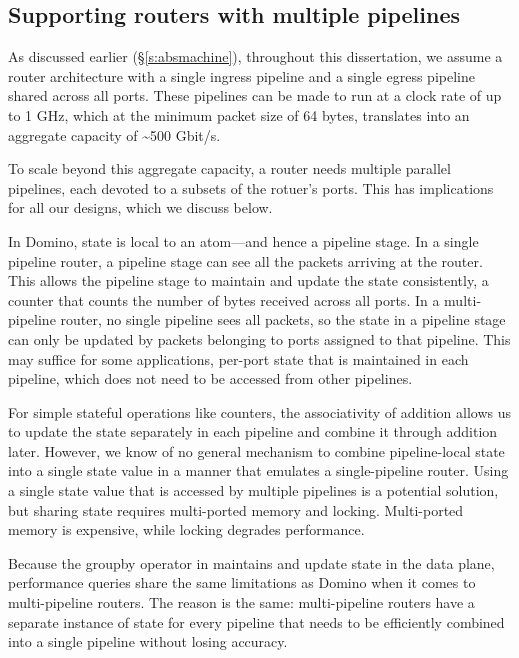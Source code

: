 \subsection{Supporting routers with multiple pipelines}
\label{ss:multiple}

As discussed earlier (\S\ref{s:absmachine}), throughout this dissertation, we
assume a router architecture with a single ingress pipeline and a single egress
pipeline shared across all ports. These pipelines can be made to run at a clock
rate of up to 1 GHz, which at the minimum packet size of 64 bytes, translates
into an aggregate capacity of \textasciitilde500 Gbit/s.

To scale beyond this aggregate capacity, a router needs multiple parallel
pipelines, each devoted to a subsets of the rotuer's ports. This has
implications for all our designs, which we discuss below.

 In Domino, state is local to an atom---and hence a pipeline
stage.  In a single pipeline router, a pipeline stage can see all the packets
arriving at the router. This allows the pipeline stage to maintain and update
the state consistently, \eg a counter that counts the number of bytes received
across all ports. In a multi-pipeline router, no single pipeline sees all
packets, so the state in a pipeline stage can only be updated by packets
belonging to ports assigned to that pipeline. This may suffice for some
applications, \eg per-port state that is maintained in each pipeline, which
does not need to be accessed from  other pipelines. 

For simple stateful operations like counters, the associativity of addition
allows us to update the state separately in each pipeline and combine it
through addition later. However, we know of no general mechanism to combine
pipeline-local state into a single state value in a manner that emulates a
single-pipeline router. Using a single state value that is accessed by multiple
pipelines is a potential solution, but sharing state requires multi-ported
memory and locking. Multi-ported memory is expensive, while locking degrades
performance.

 Because the {\ct groupby} operator in \TheSystem
maintains and update state in the data plane, performance queries share the
same limitations as Domino when it comes to multi-pipeline routers. The reason
is the same: multi-pipeline routers have a separate instance of state for every
pipeline that needs to be efficiently combined into a single pipeline without
losing accuracy.

